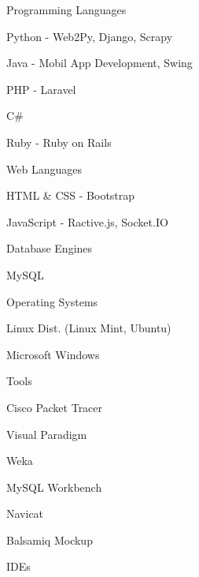 \begin{cventries}
    \cventry
        {}
        {Programming Languages}
        {}
        {}
        {
            \begin{cvitems}
                \item {Python - Web2Py, Django, Scrapy}
                \item {Java - Mobil App Development, Swing}
                \item {PHP - Laravel}
                \item {C\#}
                \item {Ruby - Ruby on Rails}
            \end{cvitems}
        }
    \cventry
        {}
        {Web Languages}
        {}
        {}
        {
            \begin{cvitems}
                \item{HTML \& CSS - Bootstrap }
                \item{JavaScript - Ractive.js, Socket.IO}
            \end{cvitems}
        }
    \cventry
        {}
        {Database Engines}
        {}
        {}
        {
            \begin{cvitems}
                \item{MySQL}
            \end{cvitems}
        }
    \cventry
        {}
        {Operating Systems}
        {}
        {}
        {
            \begin{cvitems}
                \item{Linux Dist. (Linux Mint, Ubuntu)}
                \item{Microsoft Windows}
            \end{cvitems}
        }
    \cventry
        {}
        {Tools}
        {}
        {}
        {
            \begin{cvitems}
                \item{Cisco Packet Tracer}
                \item{Visual Paradigm}
                \item{Weka}
                \item{MySQL Workbench}
                \item{Navicat}
                \item{Balsamiq Mockup}
            \end{cvitems}
        }
    \cventry
        {}
        {IDEs}
        {}
        {}
        {
            \begin{cvitems}

\end{cvitems}}
\end{cventries}
